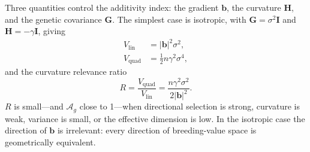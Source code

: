 \documentclass[9pt,twocolumn,twoside,lineno]{gsajnl}
\newcommand{\vect}[1]{\boldsymbol{#1}}
\newcommand{\mat}[1]{\mathbf{#1}}
\newcommand{\Ag}{\ensuremath{\mathcal{A}_{g}}\xspace}
\newcommand{\Vlin}{\ensuremath{V_{\text{lin}}}\xspace}
\newcommand{\Vquad}{\ensuremath{V_{\text{quad}}}\xspace}
\begin{document}
Three quantities control the additivity index: the gradient $\vect{b}$, the curvature $\mat{H}$, and the genetic covariance $\mat{G}$. The simplest case is isotropic, with $\mat{G} = \sigma^2 \mat{I}$ and $\mat{H} = -\gamma \mat{I}$, giving
\begin{align}
\Vlin &= |\vect{b}|^2 \sigma^2, \\
\Vquad &= \tfrac{1}{2} n \gamma^2 \sigma^4,
\end{align}
and the curvature relevance ratio
\begin{equation}
R = \frac{\Vquad}{\Vlin} = \frac{n \gamma^2 \sigma^2}{2 |\vect{b}|^2}.
\label{eq:R-isotropic}
\end{equation}
$R$ is small---and \Ag close to 1---when directional selection is strong, curvature is weak, variance is small, or the effective dimension is low. In the isotropic case the direction of $\vect{b}$ is irrelevant: every direction of breeding-value space is geometrically equivalent.
\end{document}
